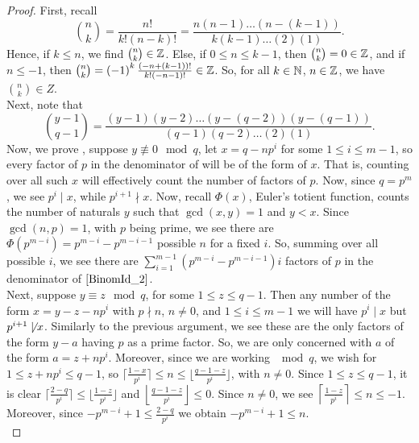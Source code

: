 \begin{proof}
First, recall \[
	\binom{n}{k} = \frac{n!}{k! \left( n-k \right) !} = \frac{n\left( n-1 \right) \ldots \left( n-\left( k-1 \right)  \right) }{k\left( k-1 \right) \ldots \left( 2 \right) \left( 1 \right) }
.\]
Hence, if \(k \le n\), we find \(\binom{n}{k} \in \mathbb{Z}\). Else, if \(0 \le n \le k-1\), then \(\binom{n}{k} = 0 \in \mathbb{Z}\), and if \(n \le -1\), then \(\binom{n}{k} = \left( -1 \right) ^{k}\frac{\left( -n +\left( k-1 \right)  \right) !}{k!\left( -n-1 \right) !} \in \mathbb{Z}\). So, for all \(k \in \mathbb{N}\), \(n \in \mathbb{Z}\), we have \(\binom{n}{k} \in Z\).\\
Next, note that \begin{equation}
	\binom{y-1}{q-1} = \frac{\left( y-1 \right) \left( y-2 \right) \ldots \left( y- (q-2) \right) \left( y - (q-1) \right)  }{\left( q-1 \right) \left( q-2 \right) \ldots \left( 2 \right) \left( 1 \right) }\label{BinomId_2}
.\end{equation}
Now, we prove , suppose \(y \not \equiv 0 \mod q\),   let \(x = q - np^{i}\) for some \(1 \le i \le m-1\), so every factor of \(p\) in the denominator of  will be of the form of \(x\). That is, counting over all such \(x\) will effectively count the number of factors of \(p\). Now, since \(q = p^{m}\), we see \(p^{i} \mid x\), while \(p^{i+1} \nmid x\). Now, recall \(\Phi\left( x \right) \), Euler's totient function, counts the number of naturals \(y\) such that \(\gcd\left( x, y \right) = 1\) and \(y < x\). Since \(\gcd\left( n, p \right) =1\), with \(p\) being prime, we see there are \(\Phi\left( p^{m-i} \right) = p^{m-i} - p^{m-i-1} \) possible \(n\) for a fixed \(i\). So, summing over all possible \(i\), we see there are \(\sum_{i= 1}^{m-1} \left( p^{m-i} - p^{m-i-1}\right) i \) factors of \(p\) in the denominator of \(\refeq{BinomId_2}\).\\
Next, suppose \(y \equiv z \mod q\), for some \( 1\le z \le q-1\). Then any number of the form \(x = y - z - np^{i}\) with \(p \nmid n\), \(n \neq 0\), and \(1 \le i \le m-1\) we will have \(p^{i} \mid x\) but \(p^{i+1} \not \mid x\). Similarly to the previous argument, we see these are the only factors of the form \(y-a\) having \(p\) as a prime factor. So, we are only concerned with \(a\) of the form \(a = z + np^{i}\). Moreover, since we are working \(\mod q\), we wish for \(1 \le z + np^{i}  \le q-1\), so \(\lceil\frac{1-x}{p^{i}} \rceil \le n \le \lfloor \frac{q-1-z}{p^{i}}\rfloor \), with \(n \neq 0\). Since \(1 \le z \le q-1\), it is clear \(\lceil\frac{2-q}{p^{i}} \rceil \le \lfloor\frac{1-z}{p^{i}} \rfloor\)  and \(\left\lfloor \frac{q-1-z}{p^{i}} \right\rfloor \le 0\). Since \(n \neq 0\), we see \(\left\lceil \frac{1-z}{p^{i}} \right\rceil \le n \le -1\). Moreover, since \(-p^{m-i} + 1 \le \frac{2-q}{p^{i}}\) we obtain \(-p^{m-i} + 1 \le n\).\\

\end{proof}
